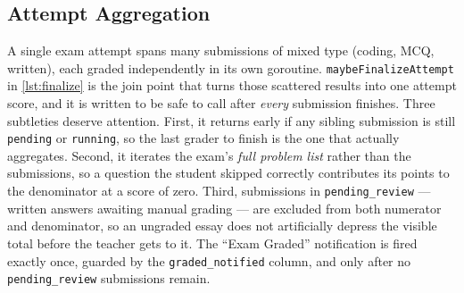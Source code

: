 \subsection{Attempt Aggregation}\label{sec:ap-d-finalize}

A single exam attempt spans many submissions of mixed type (coding, MCQ, written), each graded independently in its own goroutine. \texttt{maybeFinalizeAttempt} in \cref{lst:finalize} is the join point that turns those scattered results into one attempt score, and it is written to be safe to call after \emph{every} submission finishes. Three subtleties deserve attention. First, it returns early if any sibling submission is still \texttt{pending} or \texttt{running}, so the last grader to finish is the one that actually aggregates. Second, it iterates the exam's \emph{full problem list} rather than the submissions, so a question the student skipped correctly contributes its points to the denominator at a score of zero. Third, submissions in \texttt{pending\_review} --- written answers awaiting manual grading --- are excluded from both numerator and denominator, so an ungraded essay does not artificially depress the visible total before the teacher gets to it. The ``Exam Graded'' notification is fired exactly once, guarded by the \texttt{graded\_notified} column, and only after no \texttt{pending\_review} submissions remain.

